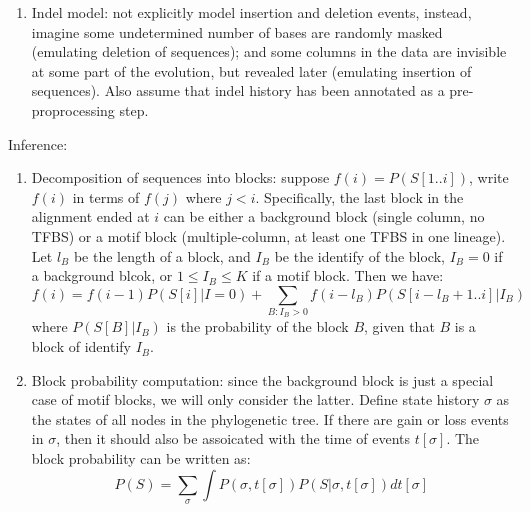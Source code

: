\documentclass[11pt]{article}
\begin{document}
\begin{enumerate}
\begin{enumerate}
\item Indel model: not explicitly model insertion and deletion events, instead, imagine some undetermined number of bases are randomly masked (emulating deletion of sequences); and some columns in the data are invisible at some part of the evolution, but revealed later (emulating insertion of sequences). Also assume that indel history has been annotated as a pre-proprocessing step. 

\end{enumerate}

Inference: 

\begin{enumerate}

\item Decomposition of sequences into blocks: suppose $f(i) = P(S[1..i])$, write $f(i)$ in terms of $f(j)$ where $j < i$. Specifically, the last block in the alignment ended at $i$ can be either a background block (single column, no TFBS) or a motif block (multiple-column, at least one TFBS in one lineage). Let $l_B$ be the length of a block, and $I_B$ be the identify of the block, $I_B = 0$ if a background blcok, or $1 \leq I_B \leq K$ if a motif block. Then we have: 
\begin{equation}
f(i) = f(i-1)P(S[i]|I=0) + \sum_{B:I_B>0}f(i-l_B) P(S[i-l_B+1..i]|I_B)
\end{equation} 
where $P(S[B]|I_B)$ is the probability of the block $B$, given that $B$ is a block of identify $I_B$. 

\item Block probability computation: since the background block is just a special case of motif blocks, we will only consider the latter. Define state history $\sigma$ as the states of all nodes in the phylogenetic tree. If there are gain or loss events in $\sigma$, then it should also be assoicated with the time of events $t[\sigma]$. The block probability can be written as: 
\begin{equation}
P(S) = \sum_{\sigma} \int{P(\sigma,t[\sigma]) P(S|\sigma,t[\sigma]) dt[\sigma]}
\end{equation}


\end{enumerate}
\end{enumerate}
\end{document}

